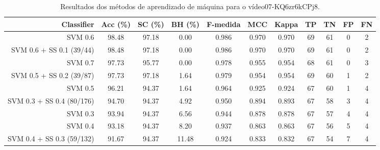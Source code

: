\begin{table}[!htb]
\centering
\caption{Resultados dos métodos de aprendizado de máquina para o vídeo07-KQ6zr6kCPj8.}
\label{tab:07-KQ6zr6kCPj8}
\begin{tabular}{r|c|c|c|c|c|c|c|c|c|c}
\hline\hline
Classifier & Acc (\%) & SC (\%) & BH (\%) & F-medida & MCC & Kappa & TP & TN & FP & FN \\ \hline
SVM 0.6 & 98.48 & 97.18 & 0.00 & 0.986 & 0.970 & 0.970 & 69 & 61 & 0 & 2 \\ 
SVM 0.6 + SS 0.1 (39/44) & 98.48 & 97.18 & 0.00 & 0.986 & 0.970 & 0.970 & 69 & 61 & 0 & 2 \\ 
SVM 0.7 & 97.73 & 95.77 & 0.00 & 0.978 & 0.955 & 0.954 & 68 & 61 & 0 & 3 \\ 
SVM 0.5 + SS 0.2 (39/87) & 97.73 & 97.18 & 1.64 & 0.979 & 0.954 & 0.954 & 69 & 60 & 1 & 2 \\ 
SVM 0.5 & 96.21 & 94.37 & 1.64 & 0.964 & 0.925 & 0.924 & 67 & 60 & 1 & 4 \\ 
SVM 0.3 + SS 0.4 (80/176) & 94.70 & 94.37 & 4.92 & 0.950 & 0.894 & 0.893 & 67 & 58 & 3 & 4 \\ 
SVM 0.3 & 93.94 & 94.37 & 6.56 & 0.944 & 0.878 & 0.878 & 67 & 57 & 4 & 4 \\ 
SVM 0.4 & 93.18 & 94.37 & 8.20 & 0.937 & 0.863 & 0.863 & 67 & 56 & 5 & 4 \\ 
SVM 0.4 + SS 0.3 (59/132) & 91.67 & 94.37 & 11.48 & 0.924 & 0.833 & 0.832 & 67 & 54 & 7 & 4 \\ 
\hline\hline
\end{tabular}
\end{table}
